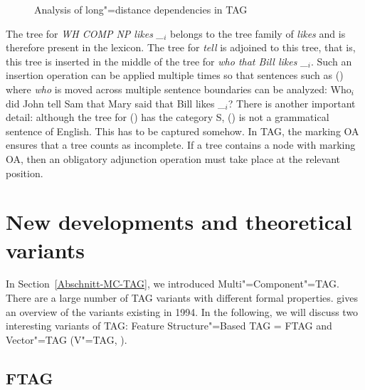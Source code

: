 \begin{figure}
\caption{\label{abb-nld-TAG}Analysis of long"=distance dependencies in TAG}
\end{figure}%
The tree for \emph{WH COMP NP likes \_$_i$} belongs to the tree family of \emph{likes} and is therefore
present in the lexicon.
The tree for \emph{tell} is adjoined to this tree, that is, this tree is inserted in the middle of the tree for
\emph{who that Bill likes \_$_i$}. Such an insertion operation can be applied multiple times so that sentences such as ()
where \emph{who} is moved across multiple sentence boundaries can be analyzed:
\ea 
Who$_i$ did John tell Sam that Mary said that Bill likes \_$_i$?
\z
%
There is another important detail: although the tree for () has the category S, () is not a grammatical
sentence of English.
\z
This has to be captured somehow. In TAG, the marking OA ensures that a tree counts as incomplete. If
a tree contains a node with marking OA, then an obligatory adjunction
operation must take place at the relevant position. 

\section{New developments and theoretical variants}

In Section~\ref{Abschnitt-MC-TAG}, we introduced Multi"=Component"=TAG. There are a large number of TAG variants with different formal properties.
\citet[\page
]{Rambow94a} gives an overview of the variants existing in 1994. In the following, we will discuss
two interesting variants of TAG: Feature Structure"=Based TAG = FTAG\indexftag  \citep{VSJ88a} and
Vector"=TAG (V"=TAG, ). 

\subsection{FTAG}

